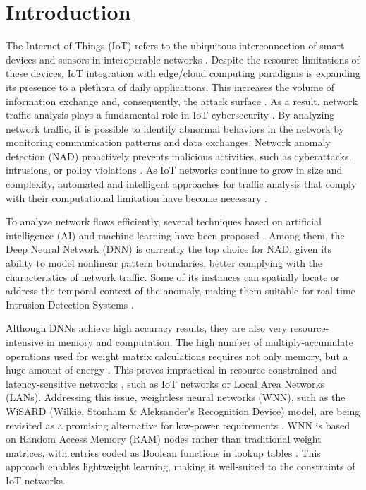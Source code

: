 \section{Introduction}

The Internet of Things (IoT) refers to the ubiquitous interconnection of smart devices and sensors in interoperable networks \cite{lin:2017}. Despite the resource limitations of these devices, IoT integration with edge/cloud computing paradigms is expanding its presence to a plethora of daily applications. This increases the volume of information exchange and, consequently, the attack surface \cite{tsimenidis:2022}. As a result, network traffic analysis plays a fundamental role in IoT cybersecurity \cite{hussain:2020}. By analyzing network traffic, it is possible to identify abnormal behaviors in the network by monitoring communication patterns and data exchanges. Network anomaly detection (NAD) proactively prevents malicious activities, such as cyberattacks, intrusions, or policy violations \cite{wang:2025, miguel:2026}. As IoT networks continue to grow in size and complexity, automated and intelligent approaches for traffic analysis that comply with their computational limitation have become necessary \cite{tsimenidis:2022}.

To analyze network flows efficiently, several techniques based on artificial intelligence (AI) and machine learning have been proposed \cite{folino:2021, alghushairy:2024, talukder:2024}. Among them, the Deep Neural Network (DNN) is currently the top choice for NAD, given its ability to model nonlinear pattern boundaries, better complying with the characteristics of network traffic. Some of its instances can spatially locate or address the temporal context of the anomaly, making them suitable for real-time Intrusion Detection Systems \cite{anis:2025}. 

Although DNNs achieve high accuracy results, they are also very resource-intensive in memory and computation. The high number of multiply-accumulate operations used for weight matrix calculations requires not only memory, but a huge amount of energy \cite{susskind:2022}. This proves impractical in resource-constrained and latency-sensitive networks \cite{hussain:2020, lello:2020, kalpani:2026}, such as IoT networks or Local Area Networks (LANs). Addressing this issue, weightless neural networks (WNN), such as the WiSARD (Wilkie, Stonham \& Aleksander’s Recognition Device) model, are being revisited as a promising alternative for low-power requirements \cite{susskind:2022}. WNN is based on Random Access Memory (RAM) nodes rather than traditional weight matrices, with entries coded as Boolean functions in lookup tables \cite{aleksander:2009, lello:2020, susskind:2022}. This approach enables lightweight learning, making it well-suited to the constraints of IoT networks.

